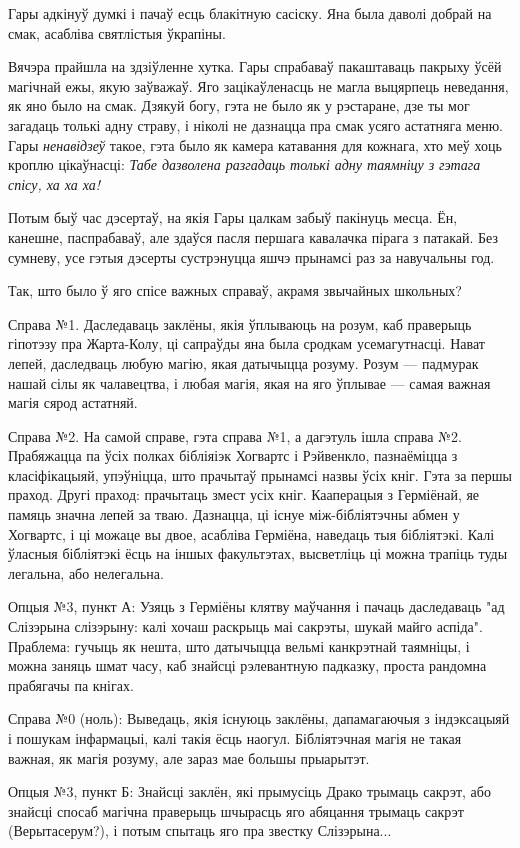 Гары адкінуў думкі і пачаў есць блакітную сасіску. Яна была даволі добрай на смак,
асабліва святлістыя ўкрапіны.

Вячэра прайшла на здзіўленне хутка. Гары спрабаваў пакаштаваць пакрыху ўсёй 
магічнай ежы, якую заўважаў. Яго зацікаўленасць не магла выцярпець неведання,
як яно было на смак. Дзякуй богу, гэта не было як у рэстаране, дзе ты мог 
загадаць толькі адну страву, і ніколі не дазнацца пра смак усяго астатняга 
меню. Гары \emph{ненавідзеў} такое, гэта было як камера катавання для кожнага,
хто меў хоць кроплю цікаўнасці:  \emph{Табе дазволена разгадаць толькі
адну таямніцу з гэтага спісу, ха ха ха!}

Потым быў час дэсертаў, на якія Гары цалкам забыў пакінуць месца. Ён, канешне,
паспрабаваў, але здаўся пасля першага кавалачка пірага з патакай. Без сумневу,
усе гэтыя дэсерты сустрэнуцца яшчэ прынамсі раз за навучальны год.

Так, што было ў яго спісе важных справаў, акрамя звычайных школьных?

\begin{em}
Справа №1. Даследаваць заклёны, якія ўплываюць на розум, каб праверыць гіпотэзу 
пра Жарта-Колу, ці сапраўды яна была сродкам усемагутнасці. Нават лепей, 
даследваць любую магію, якая датычыцца розуму. Розум --- падмурак нашай
сілы як чалавецтва, і любая магія, якая на яго ўплывае --- самая важная магія сярод
астатняй. 

Справа №2. На самой справе, гэта справа №1, а дагэтуль ішла справа №2. Прабяжацца
па ўсіх полках бібліяіэк Хогвартс і Рэйвенкло, пазнаёміцца з класіфікацыяй,
упэўніцца, што прачытаў прынамсі назвы ўсіх кніг. Гэта за першы праход.
Другі праход: прачытаць змест усіх кніг. Кааперацыя з Герміёнай, яе памяць
значна лепей за тваю. Дазнацца, ці існуе між-бібліятэчны абмен у Хогвартс,
і ці можаце вы двое, асабліва Герміёна, наведаць тыя бібліятэкі. 
Калі ўласныя бібліятэкі ёсць на іншых факультэтах, высветліць ці можна 
трапіць туды легальна, або нелегальна.


Опцыя №3, пункт А: Узяць з Герміёны клятву маўчання і пачаць даследаваць 
"ад Слізэрына слізэрыну: калі хочаш раскрыць маі сакрэты, шукай майго аспіда".
Праблема: гучыць як нешта, што датычыцца вельмі канкрэтнай таямніцы, і можна 
заняць шмат часу, каб знайсці рэлевантную падказку, проста рандомна 
прабягачы па кнігах. 

Справа №0 (ноль): Выведаць, якія існуюць заклёны, дапамагаючыя з індэксацыяй і пошукам
інфармацыі, калі такія ёсць наогул. Бібліятэчная магія не такая важная, 
як магія розуму, але зараз мае большы прыарытэт.

Опцыя №3, пункт Б: Знайсці заклён, які прымусіць Драко трымаць сакрэт, або
знайсці спосаб магічна праверыць шчырасць яго абяцання трымаць сакрэт (Верытасерум?),
і потым спытаць яго пра звестку Слізэрына... 
\end{em}

